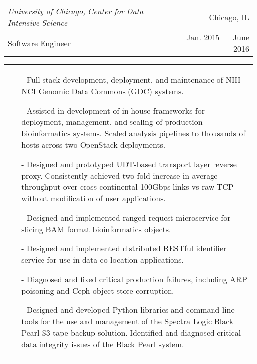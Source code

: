 \begin{tabularx}{\textwidth}{L R}
    \textit{University of Chicago, Center for Data Intensive Science} & Chicago, IL \\
    \small{Software Engineer} & \small{Jan. 2015 --- June 2016} \\
\end{tabularx}
\begin{tabularx}{\textwidth}{X}
    \begin{small}
    \begin{itemize}
        \itemsep{}
        \item[-] Full stack development, deployment, and maintenance of NIH NCI Genomic Data Commons (GDC) systems.
        \item[-] Assisted in development of in-house frameworks for deployment, management, and scaling of production bioinformatics systems. Scaled analysis pipelines to thousands of hosts across two OpenStack deployments.
        \item[-] Designed and prototyped UDT-based transport layer reverse proxy. Consistently achieved two fold increase in average throughput over cross-continental 100Gbps links vs raw TCP without modification of user applications.
        \item[-] Designed and implemented ranged request microservice for slicing BAM format bioinformatics objects.
        \item[-] Designed and implemented distributed RESTful identifier service for use in data co-location applications.
        \item[-] Diagnosed and fixed critical production failures, including ARP poisoning and Ceph object store corruption.
        \item[-] Designed and developed Python libraries and command line tools for the use and management of the Spectra Logic Black Pearl S3 tape backup solution. Identified and diagnosed critical data integrity issues of the Black Pearl system.
    \end{itemize}
    \end{small}
\end{tabularx}
